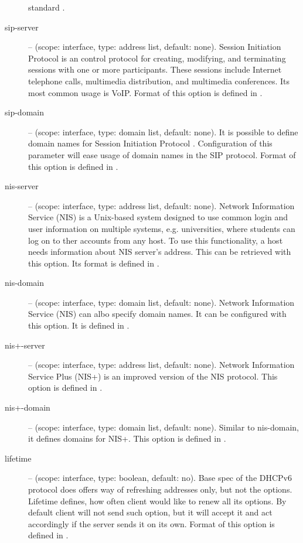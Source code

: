 \begin{description}
	    standard \cite{rfc4075}.
 \item[sip-server] -- (scope: interface, type: address list, default:
	    none). Session Initiation Protocol \cite{rfc3263} is an
	    control protocol for creating, modifying, and terminating
	    sessions with one or more participants. These sessions
	    include Internet telephone calls, multimedia distribution,
	    and multimedia conferences. Its most common usage is
	    VoIP. Format of this option is defined in \cite{rfc3319}.
 \item[sip-domain] -- (scope: interface, type: domain list, default:
	    none). It is possible to define domain names for Session
	    Initiation Protocol \cite{rfc3263}. Configuration of this
	    parameter will ease usage of domain names in the SIP
	    protocol. Format of this option is defined in
	    \cite{rfc3319}.
 \item[nis-server] -- (scope: interface, type: address list, default:
	    none). Network Information Service (NIS) is a Unix-based
	    system designed to use common login and user information on
	    multiple systems, e.g. universities, where students can log
	    on to ther accounts from any host. To use this
	    functionality, a host needs information about NIS server's
	    address. This can be retrieved with this option. Its format
	    is defined in \cite{rfc3898}.
 \item[nis-domain] -- (scope: interface, type: domain list, default:
	    none). Network Information Service (NIS) can albo specify
	    domain names. It can be configured with this option. It is
	    defined in \cite{rfc3898}.
 \item[nis+-server] -- (scope: interface, type: address list, default:
	    none). Network Information Service Plus (NIS+) is an
	    improved version of the NIS protocol. This option is defined
	    in \cite{rfc3898}.
 \item[nis+-domain] -- (scope: interface, type: domain list, default:
	    none). Similar to nis-domain, it defines domains for
	    NIS+. This option is defined in \cite{rfc3898}.
 \item[lifetime] -- (scope: interface, type: boolean, default: no). Base
	    spec of the DHCPv6 protocol does offers way of refreshing
	    addresses only, but not the options. Lifetime defines, how
	    often client would like to renew all its options. By default
	    client will not send such option, but it will accept it and
	    act accordingly if the server sends it on its own. Format of
	    this option is defined in \cite{draft-lifetime}.
\end{description}

